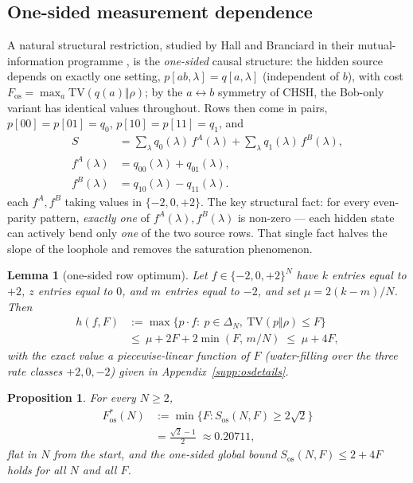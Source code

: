 \documentclass[aps,pra,reprint,superscriptaddress,floatfix]{revtex4-2}
\newcommand{\TV}{\mathrm{TV}}
\newtheorem{lemma}{Lemma}
\newtheorem{proposition}{Proposition}
\begin{document}
\subsection{One-sided measurement dependence}
\label{sec:onesided}

A natural structural restriction, studied by Hall and Branciard in their
mutual-information programme \cite{hallbranciard2020}, is the
\emph{one-sided} causal structure: the hidden source depends on exactly one
setting, $p[ab,\lambda]=q[a,\lambda]$ (independent of $b$), with cost
$F_{\mathrm{os}}=\max_a\TV(q(a)\Vert\rho)$; by the $a\leftrightarrow b$
symmetry of CHSH, the Bob-only variant has identical values throughout.
Rows then come in pairs, $p[00]=p[01]=q_0$, $p[10]=p[11]=q_1$, and
\begin{equation}
\begin{aligned}
S &= \sum_\lambda q_0(\lambda)\,f^A(\lambda)
+\sum_\lambda q_1(\lambda)\,f^B(\lambda),\\
f^A(\lambda) &= q_{00}(\lambda)+q_{01}(\lambda),\\
f^B(\lambda) &= q_{10}(\lambda)-q_{11}(\lambda).
\end{aligned}
\label{eq:osrows}
\end{equation}
each $f^A,f^B$ taking values in $\{-2,0,+2\}$. The key structural fact: for
every even-parity pattern, \emph{exactly one} of $f^A(\lambda),f^B(\lambda)$
is non-zero --- each hidden state can actively bend only \emph{one} of the
two source rows. That single fact halves the slope of the loophole and
removes the saturation phenomenon.

\begin{lemma}[one-sided row optimum]
\label{lem:osrow}
Let $f\in\{-2,0,+2\}^N$ have $k$ entries equal to $+2$, $z$ entries equal
to $0$, and $m$ entries equal to $-2$, and set $\mu=2(k-m)/N$. Then
\begin{equation}
\begin{aligned}
h(f,F) &:= \max\bigl\{p\cdot f:\ p\in\Delta_N,\ \TV(p\Vert\rho)\le F\bigr\}\\
&\le\ \mu + 2F + 2\min(F,\,m/N)\;\le\;\mu+4F,
\end{aligned}
\label{eq:osrow}
\end{equation}
with the exact value a piecewise-linear function of $F$ (water-filling over
the three rate classes $+2,0,-2$) given in Appendix~\ref{supp:osdetails}.
\end{lemma}

\begin{proposition}
\label{prop:onesided}
For every $N\ge2$,
\begin{equation}
\begin{aligned}
F^*_{\mathrm{os}}(N) &:= \min\{F : S_{\mathrm{os}}(N,F)\ge 2\sqrt2\}\\
&= \frac{\sqrt2-1}{2}\;\approx 0.20711,
\end{aligned}
\label{eq:Fos}
\end{equation}
flat in $N$ from the start, and the one-sided global bound
$S_{\mathrm{os}}(N,F)\le 2+4F$ holds for all $N$ and all $F$.
\end{proposition}
\end{document}
